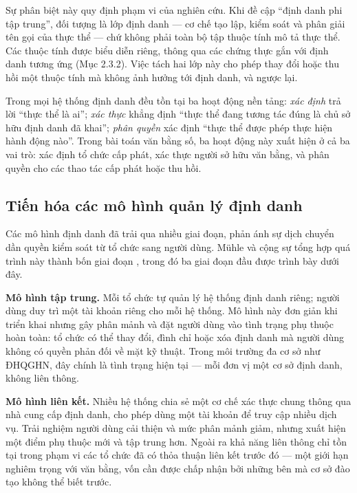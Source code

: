 Sự phân biệt này quy định phạm vi của nghiên cứu. Khi đề cập {``}định danh phi tập trung{''}, đối tượng là lớp định danh --- cơ chế tạo lập, kiểm soát và phân giải tên gọi của thực thể --- chứ không phải toàn bộ tập thuộc tính mô tả thực thể. Các thuộc tính được biểu diễn riêng, thông qua các chứng thực gắn với định danh tương ứng (Mục 2.3.2). Việc tách hai lớp này cho phép thay đổi hoặc thu hồi một thuộc tính mà không ảnh hưởng tới định danh, và ngược lại.

Trong mọi hệ thống định danh đều tồn tại ba hoạt động nền tảng: \emph{xác định} trả lời {``}thực thể là ai{''}; \emph{xác thực} khẳng định {``}thực thể đang tương tác đúng là chủ sở hữu định danh đã khai{''}; \emph{phân quyền} xác định {``}thực thể được phép thực hiện hành động nào{''}. Trong bài toán văn bằng số, ba hoạt động này xuất hiện ở cả ba vai trò: xác định tổ chức cấp phát, xác thực người sở hữu văn bằng, và phân quyền cho các thao tác cấp phát hoặc thu hồi.

\subsection{Tiến hóa các mô hình quản lý định danh}

Các mô hình định danh đã trải qua nhiều giai đoạn, phản ánh sự dịch chuyển dần quyền kiểm soát từ tổ chức sang người dùng. Mühle và cộng sự tổng hợp quá trình này thành bốn giai đoạn \cite{Muhle2018}, trong đó ba giai đoạn đầu được trình bày dưới đây.

\textbf{Mô hình tập trung.} Mỗi tổ chức tự quản lý hệ thống định danh riêng; người dùng duy trì một tài khoản riêng cho mỗi hệ thống. Mô hình này đơn giản khi triển khai nhưng gây phân mảnh và đặt người dùng vào tình trạng phụ thuộc hoàn toàn: tổ chức có thể thay đổi, đình chỉ hoặc xóa định danh mà người dùng không có quyền phản đối về mặt kỹ thuật. Trong môi trường đa cơ sở như ĐHQGHN, đây chính là tình trạng hiện tại --- mỗi đơn vị một cơ sở định danh, không liên thông.

\textbf{Mô hình liên kết.} Nhiều hệ thống chia sẻ một cơ chế xác thực chung thông qua nhà cung cấp định danh, cho phép dùng một tài khoản để truy cập nhiều dịch vụ. Trải nghiệm người dùng cải thiện và mức phân mảnh giảm, nhưng xuất hiện một điểm phụ thuộc mới và tập trung hơn. Ngoài ra khả năng liên thông chỉ tồn tại trong phạm vi các tổ chức đã có thỏa thuận liên kết trước đó --- một giới hạn nghiêm trọng với văn bằng, vốn cần được chấp nhận bởi những bên mà cơ sở đào tạo không thể biết trước.

